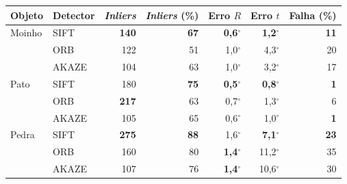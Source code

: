 \begin{tabular}{llrrrrr}
\toprule
Objeto & Detector & \textit{Inliers} & \textit{Inliers} (\%) & Erro $R$ & Erro $t$ & Falha (\%) \\
\midrule
Moinho & SIFT & \textbf{140} & \textbf{67} & \textbf{0,6}$^\circ$ & \textbf{1,2}$^\circ$ & \textbf{11} \\
 & ORB & 122 & 51 & 1,0$^\circ$ & 4,3$^\circ$ & 20 \\
 & AKAZE & 104 & 63 & 1,0$^\circ$ & 3,2$^\circ$ & 17 \\
\midrule
Pato & SIFT & 180 & \textbf{75} & \textbf{0,5}$^\circ$ & \textbf{0,8}$^\circ$ & \textbf{1} \\
 & ORB & \textbf{217} & 63 & 0,7$^\circ$ & 1,3$^\circ$ & 6 \\
 & AKAZE & 105 & 65 & 0,6$^\circ$ & 1,0$^\circ$ & \textbf{1} \\
\midrule
Pedra & SIFT & \textbf{275} & \textbf{88} & 1,6$^\circ$ & \textbf{7,1}$^\circ$ & \textbf{23} \\
 & ORB & 160 & 80 & \textbf{1,4}$^\circ$ & 11,2$^\circ$ & 35 \\
 & AKAZE & 107 & 76 & \textbf{1,4}$^\circ$ & 10,6$^\circ$ & 30 \\
\bottomrule
\end{tabular}
